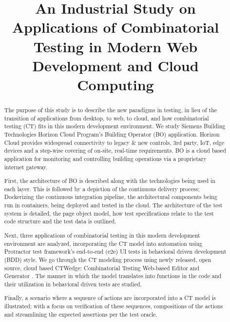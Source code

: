 \documentclass[conference]{IEEEtran}
\begin{document}
\title{An Industrial Study on Applications of Combinatorial Testing in Modern Web Development and Cloud Computing}


\author{
}

\maketitle


\begin{abstract}
The purpose of this study is to describe the new paradigms in testing,
in lieu of the transition of applications from desktop, to web, to cloud, and how combinatorial testing (CT) fits in this modern development environment. 
We study Siemens Building Technologies Horizon Cloud Program's Building Operator (BO) application.
Horizon Cloud provides widespread connectivity to legacy \& new controls, 3rd party, IoT, edge devices and a step-wise covering of on-site, real-time requirements. 
BO is a cloud based application for monitoring and controlling building operations via a proprietary internet gateway.

First, the architecture of BO is described along with the technologies being used in each layer. 
This is followed by a depiction of the continuous delivery process; Dockerizing \cite{wiki:docker} the continuous integration pipeline,
the architectural components being run in containers, being deployed and tested in the cloud. 
The architecture of the test system is detailed, the page object model, how test specifications relate to the test code structure and the test data is outlined. 

Next, three applications of combinatorial testing in this modern development environment are analyzed,
incorporating the CT model into automation using Protractor test framework's end-to-end (e2e) UI tests in behavioral driven development (BDD) style. 
We go through the CT modeling process using newly released, open source, cloud based CTWedge: Combinatorial Testing Web-based Editor and Generator \cite{gargantini2018migrating}. 
The manner in which the model translates into functions in the code and their utilization in behavioral driven tests are studied.

Finally, a scenario where a sequence of actions are incorporated into a CT model is illustrated;
with a focus on verification of these sequences, compositions of the actions and streamlining the expected assertions per the test oracle.

\end{abstract}
\end{document}
